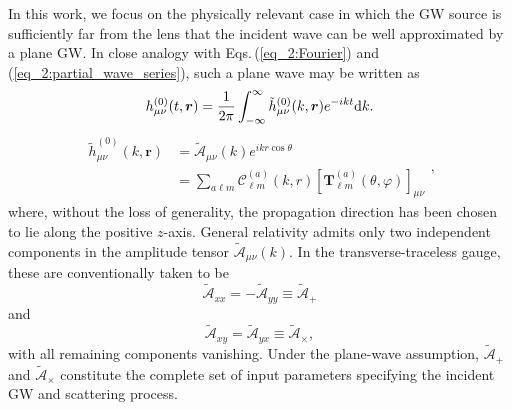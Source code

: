 \documentclass[reprint,amsmath,amssymb,aps,prd]{revtex4-2}
\newcommand{\dd}[0]{\mathrm{d}}
\begin{document}
In this work, we focus on the physically relevant case in which the GW source is sufficiently far from the lens that the incident wave can be well approximated by a plane GW. In close analogy with Eqs.\,(\ref{eq_2:Fourier}) and (\ref{eq_2:partial_wave_series}), such a plane wave may be written as
\begin{equation}
\label{eq_3:incident_Fourier}
h_{\mu\nu}^{\rm(0)}(t,\bm{r})
=\frac{1}{2\pi}\int_{-\infty}^{\infty}\tilde{h}^{(0)}_{\mu\nu}(k,\bm{r})e^{-ikt}\dd k.
\end{equation}
\begin{equation}
\label{eq_3:incident_partial_wave_series}
\begin{aligned}
\tilde{h}^{(0)}_{\mu\nu}(k,\bm{r})&=\tilde{\mathcal{A}}_{\mu\nu}(k)e^{ikr\cos\theta}\\
&=\sum_{a\ell m}
\mathscr{C}^{(a)}_{\ell m}(k,r)
\left[\mathbf{T}_{\ell m}^{(a)}(\theta,\varphi)\right]_{\mu\nu}
\end{aligned},
\end{equation}
where, without the loss of generality, the propagation direction has been chosen to lie along the positive $z$-axis. General relativity admits only two independent components in the amplitude tensor $\tilde{\mathcal{A}}_{\mu\nu}(k)$. In the transverse-traceless gauge, these are conventionally taken to be
\begin{equation}
\tilde{\mathcal{A}}_{xx}
=-\tilde{\mathcal{A}}_{yy}
\equiv\tilde{\mathcal{A}}_{+}
\end{equation}
and
\begin{equation}
\tilde{\mathcal{A}}_{xy}
=\tilde{\mathcal{A}}_{yx}
\equiv\tilde{\mathcal{A}}_{\times},
\end{equation}
with all remaining components vanishing. Under the plane-wave assumption, $\tilde{\mathcal{A}}_{+}$ and $\tilde{\mathcal{A}}_{\times}$ constitute the complete set of input parameters specifying the incident GW and scattering process.
\end{document}
